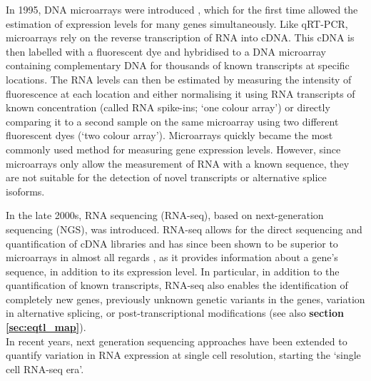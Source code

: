 In 1995, DNA microarrays were introduced \cite{schena1995quantitative}, which for the first time allowed the estimation of expression levels for many genes simultaneously.
Like qRT-PCR, microarrays rely on the reverse transcription of RNA into cDNA.
This cDNA is then labelled with a fluorescent dye and hybridised to a DNA microarray containing complementary DNA for thousands of known transcripts at specific locations. 
The RNA levels can then be estimated by measuring the intensity of fluorescence at each location and either normalising it using RNA transcripts of known concentration (called RNA spike-ins; `one colour array') or directly comparing it to a second sample on the same microarray using two different fluorescent dyes (`two colour array').
Microarrays quickly became the most commonly used method for measuring gene expression levels. 
However, since microarrays only allow the measurement of RNA with a known sequence, they are not suitable for the detection of novel transcripts or alternative splice isoforms. 

In the late 2000s, RNA sequencing (RNA-seq), based on next-generation sequencing (NGS), 
was introduced.
RNA-seq allows for the direct sequencing and quantification of cDNA libraries \cite{mortazavi2008mapping} and has since been shown to be superior to microarrays in almost all regards 
\cite{marioni2008rna}, as it provides information about a gene's sequence, in addition to its expression level.
In particular, in addition to the quantification of known transcripts, RNA-seq also enables the identification of completely new genes, previously unknown genetic variants in the genes, variation in alternative splicing, or post-transcriptional modifications (see also \textbf{section 
\ref{sec:eqtl_map}}).
\\

In recent years, next generation sequencing approaches have been extended to quantify variation in RNA expression at single cell resolution, starting the `single cell RNA-seq era'.


